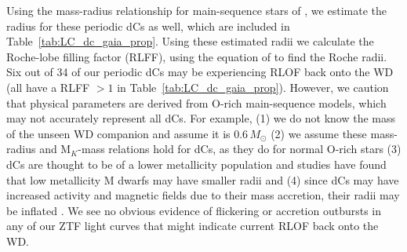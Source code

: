 \documentclass[twocolumn]{aastex631}
\begin{document}
Using the mass-radius relationship for main-sequence stars of \citet{Eker2018}, we estimate the radius for these periodic dCs as well, which are included in Table~\ref{tab:LC_dc_gaia_prop}. Using these estimated radii we calculate the Roche-lobe filling factor (RLFF), using the equation of \citet{Eggleton1983} to find the Roche radii. Six out of 34 of our periodic dCs may be experiencing RLOF back onto the WD (all have a RLFF $>1$ in Table~\ref{tab:LC_dc_gaia_prop}). However, we caution that physical parameters are derived from O-rich main-sequence models, which may not accurately represent all dCs. For example, (1) we do not know the mass of the unseen WD companion and assume it is $0.6$\,$M_\odot$ (2) we assume these mass-radius and M$_K$-mass relations hold for dCs, as they do for normal O-rich stars (3) dCs are thought to be of a lower metallicity population and studies have found that low metallicity M dwarfs may have smaller radii \citep{Kesseli2019} and (4) since dCs may have increased activity and magnetic fields due to their mass accretion, their radii may be inflated \citep{Kesseli2018}. We see no obvious evidence of flickering or accretion outbursts in any of our ZTF light curves that might indicate current RLOF back onto the WD.
\end{document}
